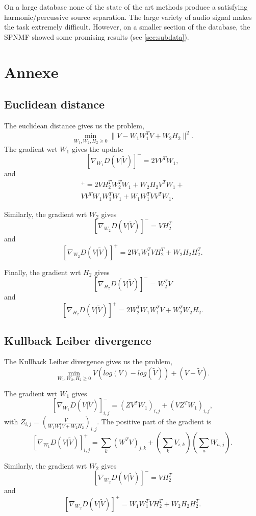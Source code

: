 \documentclass[journal]{IEEEtran}
\begin{document}
On a large database none of the state of the art methods produce a satisfying harmonic/percussive source separation. The large variety of audio signal makes the task extremely difficult. However, on a smaller section of the database, the SPNMF showed some promising results (see \ref{sec:subdata}).





\section*{Annexe}

\subsection{Euclidean distance}\label{euclidisteq}
The euclidean distance gives us the problem,
$$\min_{W_1,W_2,H_2 \geq 0} \|V - W_{1}W_{1}^{T}V + W_{2} H_{2} \|^2.$$
The gradient wrt $W_1$ gives the update
$$[\nabla_{W_1} D(V|\tilde{V})]^{-} = 2 VV^TW_1, $$
and
\begin{align*}
[\nabla_{W_1} D(V|\tilde{V})]^{+} = 2VH_2^TW_2^TW_1 + W_2H_2V^TW_1 + \\ VV^TW_1W_1^TW_1 + W_1W_1^TVV^TW_1.
\end{align*}

Similarly, the gradient wrt $W_2$ gives
$$ [\nabla_{W_2} D(V|\tilde{V})]^{-} = VH_2^T $$
and
$$ [\nabla_{W_2} D(V|\tilde{V})]^{+} = 2W_1W_1^TVH_2^T + W_2H_2H_2^T.$$

Finally, the gradient wrt $H_2$ gives
$$ [\nabla_{H_2} D(V|\tilde{V})]^{-} = W_2^TV  $$
and
$$ [\nabla_{H_2} D(V|\tilde{V})]^{+} = 2W_2^TW_1W_1^TV + W_2^TW_2H_2. $$


\subsection{Kullback Leiber divergence}\label{KLdisteq}
The Kullback Leiber divergence gives us the problem,
$$\min_{W_1,W_2,H_2 \geq 0} V(log(V) - log(\tilde{V})) + (V-\tilde{V}).$$

The gradient wrt $W_1$ gives
$$[\nabla_{W_1} D(V|\tilde{V})]_{i,j}^{-} = (ZV^TW_1)_{i,j} + (VZ^TW_1)_{i,j},$$
with $Z_{i,j} = (\frac{V}{W_1W_1^TV + W_2H_2})_{i,j}$. The positive part of the gradient is
$$[\nabla_{W_1} D(V|\tilde{V})]^{+}_{i,j} = \sum_k(W^TV)_{j,k} + (\sum_{k}V_{i,k})(\sum_a W_{a,j}).$$


Similarly, the gradient wrt $W_2$ gives
$$ [\nabla_{W_2} D(V|\tilde{V})]^{-} = VH_2^T $$
and
$$ [\nabla_{W_2} D(V|\tilde{V})]^{+} = W_1W_1^TVH_2^T + W_2H_2H_2^T.$$
\end{document}
